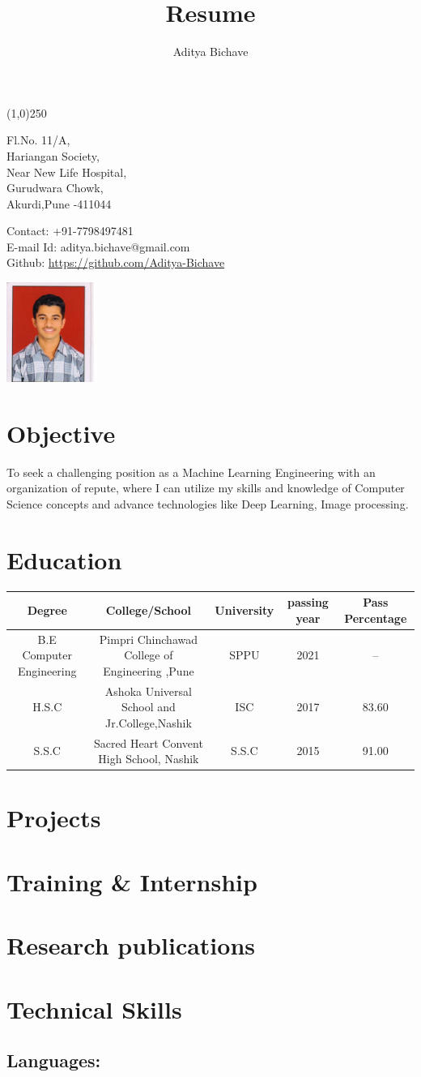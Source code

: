 \documentclass[10pt]{article}
\makeatletter
\renewcommand{\maketitle}{
\begin{center}
{\LARGE\bfseries
\theauthor}

\vspace{.25em}
\line(1,0){250}
\end{center}
\begin{multicols}{2}
\noindent
Fl.No. 11/A,\\
Hariangan Society,\\
Near New Life Hospital,\\
Gurudwara Chowk,\\
Akurdi,Pune -411044\\

\columnbreak
\begin{flushright}
Contact: +91-7798497481\\
E-mail Id: aditya.bichave@gmail.com\\
Github: \url{https://github.com/Aditya-Bichave}
\end{flushright}
\noindent
\hspace{10em}
\includegraphics[width = 8em]{Aditya.jpg}

\end{multicols}



}
\makeatother
\begin{document}
\title{Resume}
\author{Aditya Bichave}
\maketitle

\section{Objective}

To seek a challenging position as a Machine Learning Engineering with an organization of repute, where I can utilize my skills and knowledge of Computer Science concepts and advance technologies like Deep Learning, Image processing.

\section{Education}

\begin{tabular}[8pt]{| c | c | c | c | c |}
\hline
	Degree & College/School & University & passing year & Pass Percentage\\
\hline
	B.E Computer Engineering & Pimpri Chinchawad College of Engineering ,Pune & SPPU & 2021 & -- \\
\hline
	H.S.C & Ashoka Universal School and Jr.College,Nashik & ISC & 2017 & 83.60 \\
\hline
	S.S.C & Sacred Heart Convent High School, Nashik & S.S.C & 2015 & 91.00\\
\hline
\end{tabular} 

\section{Projects}



\section{Training \& Internship}

\section{Research publications}

\section{Technical Skills}
	\subsection{Languages:}
\end{document}
